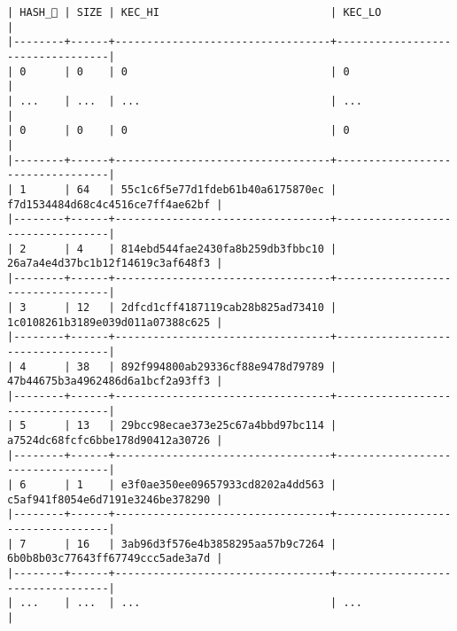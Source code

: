 \documentclass[varwidth=\maxdimen,margin=0.5cm,multi={verbatim}]{standalone}
\begin{document}
\begin{verbatim}
| HASH_ | SIZE | KEC_HI                           | KEC_LO                           |
|--------+------+----------------------------------+----------------------------------|
| 0      | 0    | 0                                | 0                                |
| ...    | ...  | ...                              | ...                              |
| 0      | 0    | 0                                | 0                                |
|--------+------+----------------------------------+----------------------------------|
| 1      | 64   | 55c1c6f5e77d1fdeb61b40a6175870ec | f7d1534484d68c4c4516ce7ff4ae62bf |
|--------+------+----------------------------------+----------------------------------|
| 2      | 4    | 814ebd544fae2430fa8b259db3fbbc10 | 26a7a4e4d37bc1b12f14619c3af648f3 |
|--------+------+----------------------------------+----------------------------------|
| 3      | 12   | 2dfcd1cff4187119cab28b825ad73410 | 1c0108261b3189e039d011a07388c625 |
|--------+------+----------------------------------+----------------------------------|
| 4      | 38   | 892f994800ab29336cf88e9478d79789 | 47b44675b3a4962486d6a1bcf2a93ff3 |
|--------+------+----------------------------------+----------------------------------|
| 5      | 13   | 29bcc98ecae373e25c67a4bbd97bc114 | a7524dc68fcfc6bbe178d90412a30726 |
|--------+------+----------------------------------+----------------------------------|
| 6      | 1    | e3f0ae350ee09657933cd8202a4dd563 | c5af941f8054e6d7191e3246be378290 |
|--------+------+----------------------------------+----------------------------------|
| 7      | 16   | 3ab96d3f576e4b3858295aa57b9c7264 | 6b0b8b03c77643ff67749ccc5ade3a7d |
|--------+------+----------------------------------+----------------------------------|
| ...    | ...  | ...                              | ...                              |
\end{verbatim}
\end{document}
